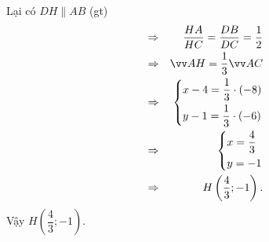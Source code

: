 \begin{bt}
{\begin{enumerate}
Lại có $DH\parallel AB$ (gt)
		\begin{eqnarray*}
		&\Rightarrow &\dfrac{HA}{HC}=\dfrac{DB}{DC}=\dfrac{1}{2}\\
		&\Rightarrow &\overrightarrow{AH}=\dfrac{1}{3}\overrightarrow{AC}\\
		&\Rightarrow &\heva{&x-4=\dfrac{1}{3}\cdot(-8)\\ &y-1=\dfrac{1}{3}\cdot(-6)}\\
		&\Rightarrow &\heva{&x=\dfrac{4}{3}\\ &y=-1}\\
		&\Rightarrow &H\left(\dfrac{4}{3};-1\right).
		\end{eqnarray*}
	Vậy $H\left(\dfrac{4}{3};-1\right)$.
	\end{enumerate}
}
\end{bt}
